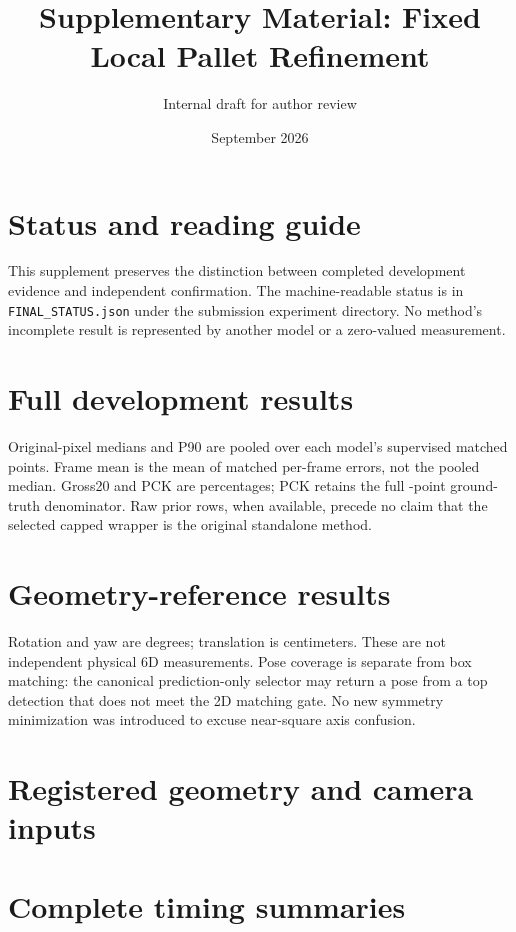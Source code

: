 \documentclass[10pt]{article}
\title{Supplementary Material: Fixed Local Pallet Refinement}
\author{Internal draft for author review}
\date{September 2026}
\begin{document}
\maketitle
\section{Status and reading guide}
This supplement preserves the distinction between completed development evidence and independent confirmation. The machine-readable status is in \texttt{FINAL\_STATUS.json} under the submission experiment directory. \PriorTrainingStatus{} \ConfirmationAbstract{} No method's incomplete result is represented by another model or a zero-valued measurement.
\section{Full development results}
Original-pixel medians and P90 are pooled over each model's supervised matched points. Frame mean is the mean of matched per-frame errors, not the pooled median. Gross20 and PCK are percentages; PCK retains the full \AllPoints{}-point ground-truth denominator. Raw prior rows, when available, precede no claim that the selected capped wrapper is the original standalone method.
\small\normalsize
\section{Geometry-reference results}
Rotation and yaw are degrees; translation is centimeters. These are not independent physical 6D measurements. Pose coverage is separate from box matching: the canonical prediction-only selector may return a pose from a top detection that does not meet the 2D matching gate. No new symmetry minimization was introduced to excuse near-square axis confusion.
\small\normalsize
\section{Registered geometry and camera inputs}
\small\normalsize
\section{Complete timing summaries}
\RuntimePanelStatus{}
\end{document}
